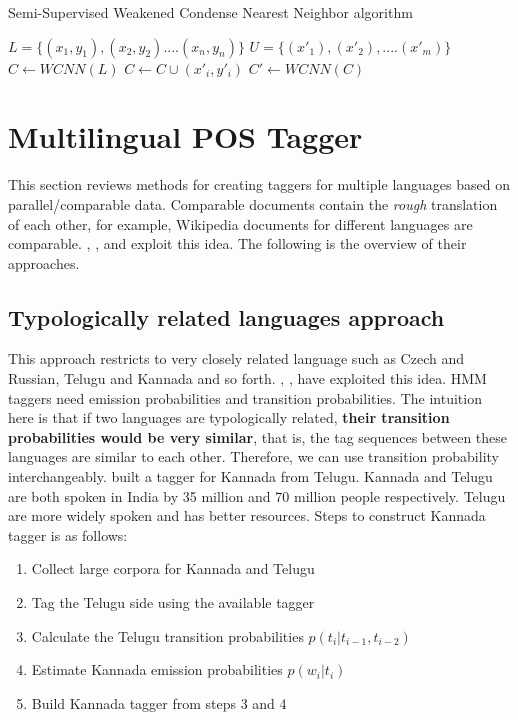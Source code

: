 \begin{algorithm}
\caption{Semi-Supervised Weakened Condense Nearest Neighbor algorithm}
\label{alg:semiSupcondenseNN}
\begin{algorithmic} [1]
\STATE $L = \{(x_1,y_1),(x_2,y_2) .... (x_n,y_n)\} $ 
\STATE $U = \{(x'_1),(x'_2), .... (x'_m)\}$
\STATE $C \leftarrow WCNN(L)$
	\STATE $C \leftarrow C \cup (x'_i,y'_i)$		
	\ENDIF
\ENDFOR
\STATE $C' \leftarrow WCNN(C)$
\end{algorithmic}
\end{algorithm}

\section{Multilingual POS Tagger}
This section reviews methods for creating taggers for multiple languages based on parallel/comparable data. Comparable documents contain the \emph{rough} translation of each other, for example, Wikipedia documents for different languages are comparable. , ,  and  exploit this idea. The following is the overview of their approaches. 

\subsection{Typologically related languages approach}
This approach restricts to very closely related language such as Czech and Russian, Telugu and Kannada and so forth. , ,  have exploited this idea. HMM taggers need emission probabilities and transition probabilities. The intuition here is that if two languages are typologically related, \textbf{their transition probabilities would be very similar}, that is, the tag sequences between these languages are similar to each other. Therefore, we can use transition probability interchangeably.  built a tagger for Kannada from Telugu. Kannada and Telugu are both spoken in India by 35 million and 70 million people respectively. Telugu are more widely spoken and has better resources. Steps to construct Kannada tagger is as follows: 
\begin{enumerate}
\setlength{\itemsep}{0pt}
\item Collect large corpora for Kannada and Telugu 
\item Tag the Telugu side using the available tagger
\item Calculate the Telugu transition probabilities $p(t_i|t_{i-1},t_{i-2})$
\item Estimate Kannada emission probabilities $p(w_i|t_i)$
\item Build Kannada tagger from steps 3 and 4
\end{enumerate}


